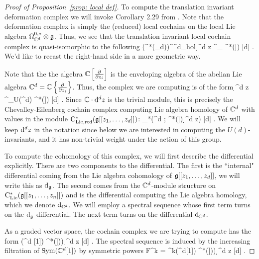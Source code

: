 \begin{proof}[Proof of Proposition~\ref{prop: local def}]
To compute the translation invariant deformation complex we will invoke Corollary 2.29 from \cite{BWhol}. 
Note that the deformation complex is simply the (reduced) local cochains on the local Lie algebra $\Omega^{0,*}_{\mathbb C^d} \otimes \mathfrak g$. 
Thus, we see that the translation invariant local cochain complex is quasi-isomorphic to the following
\beqn\label{holtransinvt}
\left(\cloc^*(\sG_d)\right)^{\CC^{d}_{\rm hol}} \; \simeq \; \CC \cdot \d^d z \tensor^{\LL}_{\CC{}} \cred^*(\fg[[z_1,\ldots,z_d]])  [d] .
\eeqn
We'd like to recast the right-hand side in a more geometric way. 

Note that the the algebra $\mathbb C\left[\frac{\partial}{\partial z_i}\right]$ is the enveloping algebra of the abelian Lie algebra $\mathbb C^d = \mathbb C\left\{\frac{\partial}{\partial z_i}\right\}$. 
Thus, the complex we are computing is of the form
\beqn
\CC \cdot \d^d z \tensor^{\LL}_{U(\CC^d)} \cred^*(\fg[[z_1,\ldots,z_d]]) [d] .
\eeqn
Since $\mathbb C \cdot {\rm d}^d z$ is the trivial module, this is precisely the Chevalley-Eilenberg cochain complex computing Lie algebra homology of $\mathbb C^d$ with values in the module ${\rm C}_{\rm Lie, red}^*(\mathfrak g[[z_1,\ldots,z_d]])$:
\beqn
\clieu_*\left(\CC^d ; \cred^*(\fg[[z_1,\ldots,z_d]]) \d^d z\right) [d] .
\eeqn
We will keep ${\rm d}^d z$ in the notation since below we are interested in computing the $U(d)$-invariants, and it has non-trivial weight under the action of this group.

To compute the cohomology of this complex, we will first describe the differential explicitly. 
There are two components to the differential.
The first is the ``internal" differential coming from the Lie algebra cohomology of $\mathfrak g [[z_1,\ldots,z_d]]$, we will write this as ${\rm d}_{\mathfrak g}$. 
The second comes from the $\mathbb C^d$-module structure on ${\rm C}_{{\rm Lie}}^*(\mathfrak g[[z_1,\ldots,z_n]])$ and is the differential computing the Lie algebra homology, which we denote ${\rm d}_{\mathbb C^d}$. 
We will employ a spectral sequence whose first term turns on the ${\rm d}_{\mathfrak g}$ differential.
The next term turns on the differential ${\rm d}_{\mathbb C^d}$.

As a graded vector space, the cochain complex we are trying to compute has the form
\beqn
\Sym(\CC^d [1]) \tensor \cred^*\left(\fg[[z_1,\ldots,z_d]])\right) \d^d z [d] .
\eeqn
The spectral sequence is induced by the increasing filtration of ${\rm Sym}(\mathbb C^d [1])$ by symmetric powers
\beqn
F^k = \Sym^{\leq k}(\CC^d[1]) \tensor \cred^*\left(\fg[[z_1,\ldots,z_d]])\right) \d^d z [d] .
\eeqn


\end{proof}

